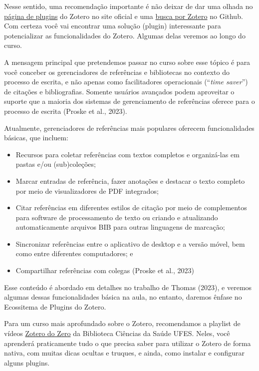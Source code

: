 \documentclass[
  a4paper,
]{article}
\begin{document}
Nesse sentido, uma recomendação importante é não deixar de dar uma
olhada no \href{https://www.zotero.org/support/plugins}{página de
plugins} do Zotero no site oficial e uma
\href{https://github.com/search?q=zotero&type=repositories}{busca por
Zotero} no Github. Com certeza você vai encontrar uma solução (plugin)
interessante para potencializar as funcionalidades do Zotero. Algumas
delas veremos ao longo do curso.

A mensagem principal que pretendemos passar no curso sobre esse tópico é
para você conceber os gerenciadores de referências e bibliotecas no
contexto do processo de escrita, e não apenas como facilitadores
operacionais (``\emph{time saver}'') de citações e bibliografias.
Somente usuários avançados podem aproveitar o suporte que a maioria dos
sistemas de gerenciamento de referências oferece para o processo de
escrita (Proske et al., 2023).

Atualmente, gerenciadores de referências mais populares oferecem
funcionalidades básicas, que incluem:

\begin{itemize}
\item
  Recursos para coletar referências com textos completos e organizá-las
  em pastas e/ou (sub)coleções;
\item
  Marcar entradas de referência, fazer anotações e destacar o texto
  completo por meio de visualizadores de PDF integrados;
\item
  Citar referências em diferentes estilos de citação por meio de
  complementos para software de processamento de texto ou criando e
  atualizando automaticamente arquivos BIB para outras linguagens de
  marcação;
\item
  Sincronizar referências entre o aplicativo de desktop e a versão
  móvel, bem como entre diferentes computadores; e
\item
  Compartilhar referências com colegas (Proske et al., 2023)
\end{itemize}

Esse conteúdo é abordado em detalhes no trabalho de Thomas (2023), e
veremos algumas dessas funcionalidades básica na aula, no entanto,
daremos ênfase no Ecossitema de Plugins do Zotero.

Para um curso mais aprofundado sobre o Zotero, recomendamos a playlist
de vídeos
\href{https://youtube.com/playlist?list=PLEbpo1iiweYXhQs1-yKJhTLPio1PlBD0i&si=bI3_sDEQe58XOCTf}{Zotero
do Zero} da Biblioteca Ciências da Saúde UFES. Neles, você aprenderá
praticamente tudo o que precisa saber para utilizar o Zotero de forma
nativa, com muitas dicas ocultas e truques, e ainda, como instalar e
configurar alguns plugins.
\end{document}
